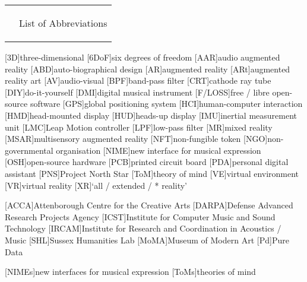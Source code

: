 \newpage
{}
\vspace*{2cm}
\noindent\Vlines\hspace*{-2em}%
\begin{tabular}{@{}p{1cm} p{\textwidth-3cm}}%
  \relax
  &\Huge\bfseries\raggedright List of Abbreviations
\end{tabular}
\vspace*{1cm}
\begin{SingleSpace}
	\begin{acronym}[F/LOSS]
		[3D]{three-dimensional}
		{six degrees of freedom}
		[AAR]{audio augmented reality}
		[ABD]{auto-biographical design}
		[AR]{augmented reality}
		[ARt]{augmented reality art}
		[AV]{audio-visual}
		[BPF]{band-pass filter}
		[CRT]{cathode ray tube}
		[DIY]{do-it-yourself}
		[DMI]{digital musical instrument}
		[F/LOSS]{free / libre open-source software}
		[GPS]{global positioning system}
		[HCI]{human-computer interaction}
		[HMD]{head-mounted display}
		[HUD]{heads-up display}
		[IMU]{inertial measurement unit}
		[LMC]{Leap Motion controller}
		[LPF]{low-pass filter}
		[MR]{mixed reality}
		{multisensory augmented reality}
		[NFT]{non-fungible token}
		[NGO]{non-governmental organisation}
		{new interface for musical expression}
		[OSH]{open-source hardware}
		[PCB]{printed circuit board}
		[PDA]{personal digital assistant}
		[PNS]{Project North Star}
		[ToM]{theory of mind}
		[VE]{virtual environment}
		[VR]{virtual reality}
		[XR]{`all / extended / * reality'}
		
		{Attenborough Centre for the Creative Arts}
		[DARPA]{Defense Advanced Research Projects Agency}
		{Institute for Computer Music and Sound Technology}
		[IRCAM]{Institute for Research and Coordination in Acoustics / Music}
		[SHL]{Sussex Humanities Lab}
		{Museum of Modern Art}
		[Pd]{Pure Data}

		[NIMEs]{new interfaces for musical expression}
		{theories of mind}

	\end{acronym}
\end{SingleSpace}